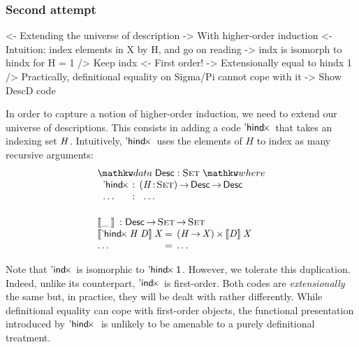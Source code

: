 \subsubsection{Second attempt}

\begin{wstructure}
<- Extending the universe of description
    -> With higher-order induction
    <- Intuition: index elements in X by H, and go on reading
        -> indx is isomorph to hindx for H = 1
    /> Keep indx
        <- First order!
        -> Extensionally equal to hindx 1
        /> Practically, definitional equality on Sigma/Pi cannot cope with it
    -> Show DescD code
\end{wstructure}

In order to capture a notion of higher-order induction, we need to
extend our universe of descriptions. This consists in adding a code
$\DHindx{\!}{\!}$ that takes an indexing set $\V{H}$. Intuitively,
$\DHindx{\!}{\!}$ uses the elements of $H$ to index as many recursive
arguments:
%
\[\stk{
\begin{array}{ll}
\stk{
\data \Desc : \Set \where \\
\;\;\begin{array}{@{}l@{\::\:\:}l@{\quad}l}
    \DHindx{\!}{\!} & \PI{\V{H}}{\Set} \Desc \To \Desc \\
    \ldots          & \:\:\ldots
\end{array}
}
\vspace{0.2in}
\\
\stk{
\descop{\_\:}{} : \Desc \To \Set \To \Set \\
\begin{array}{@{}l@{\:=\:\:}ll}
\descop{\DHindx{\V{H}}{\V{D}}}{\V{X}}     &  \TIMES{(\V{H} \To \V{X})}{\descop{\V{D}}{\V{X}}} \\
\ldots                                    &  \ldots 
\end{array}
}
\end{array}
}\]


Note that $\DIndx{\!}$ is isomorphic to $\DHindx{\Unit}{\!}$. However,
we tolerate this duplication. Indeed, unlike its counterpart,
$\DIndx{\!}$ is first-order. Both codes are \emph{extensionally} the
same but, in practice, they will be dealt with rather
differently. While definitional equality can cope with first-order
objects, the functional presentation introduced by $\DHindx{\!}{}$ is
unlikely to be amenable to a purely definitional treatment.

